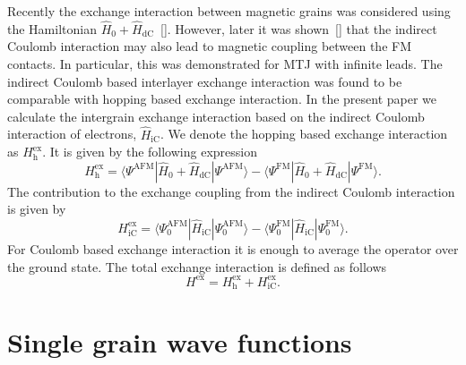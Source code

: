 \documentclass[aps,prb,amsmath,amssymb,twocolumn,superscriptaddress,showpacs,floatfix]{revtex4-1}
\begin{document}
Recently the exchange interaction between magnetic grains was considered using
the Hamiltonian $\hat H_0+\hat H_\mathrm{dC}$~[]. However, later
it was shown~[] that the indirect Coulomb interaction may also lead to magnetic coupling between the FM contacts.
In particular, this was demonstrated for MTJ with infinite leads.
The indirect Coulomb based interlayer exchange interaction was found to be comparable with hopping
based exchange interaction. In the present paper we calculate the intergrain exchange
interaction based on the indirect Coulomb interaction of electrons,
$\hat H^\mathrm{}_\mathrm{iC}$. We denote the hopping based exchange interaction
as $H^\mathrm{ex}_\mathrm h$. It is given by the following expression
\begin{equation}\label{Eq:ExHopGen}
H^\mathrm{ex}_\mathrm h=\langle\Psi^\mathrm{AFM}|\hat H_0+\hat H_\mathrm{dC}|\Psi^\mathrm{AFM}\rangle-\langle\Psi^\mathrm{FM}|\hat H_0+\hat H_\mathrm{dC}|\Psi^\mathrm{FM}\rangle.
\end{equation}
The contribution to the exchange coupling from the indirect Coulomb interaction is given by
\begin{equation}\label{Eq:ExCoulGen}
H^\mathrm{ex}_\mathrm{iC}=\langle\Psi^\mathrm{AFM}_0|\hat H^\mathrm{}_\mathrm{iC}|\Psi^\mathrm{AFM}_0\rangle-\langle\Psi^\mathrm{FM}_0|\hat H^\mathrm{}_\mathrm{iC}|\Psi^\mathrm{FM}_0\rangle.
\end{equation}
For Coulomb based exchange interaction it is enough to average the
operator over the ground state. The total exchange interaction is defined as follows
\begin{equation}\label{Eq:ExTot}
H^\mathrm{ex}=H^\mathrm{ex}_\mathrm h+H^\mathrm{ex}_\mathrm{iC}.
\end{equation}



\section{Single grain wave functions}\label{Sec:Wf}
\end{document}
